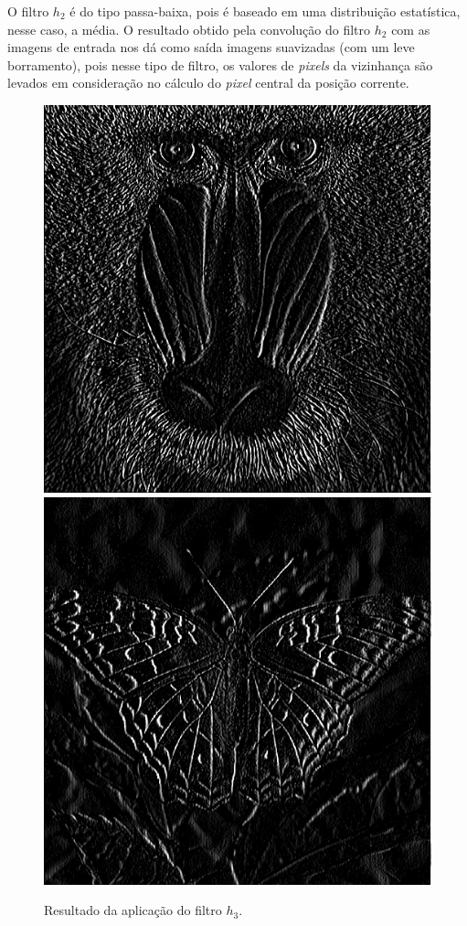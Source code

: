 \documentclass[twoside,twocolumn]{article}
\begin{document}
O filtro $h_{2}$ é do tipo passa-baixa, pois é baseado em uma distribuição estatística, nesse caso, a média. O resultado obtido pela convolução do filtro $h_{2}$ com as imagens de entrada nos dá como saída imagens suavizadas (com um leve borramento), pois nesse tipo de filtro, os valores de \textit{pixels} da vizinhança são levados em consideração no cálculo do \textit{pixel} central da posição corrente.

\begin{figure}[H]
\begin{center}
	\includegraphics[scale=.19]{figures/baboon_h3.png}
	\includegraphics[scale=.19]{figures/butterfly_h3.png}
\caption{Resultado da aplicação do filtro $h_{3}$.} \label{gdimotes}
\end{center}
\end{figure}
\end{document}
